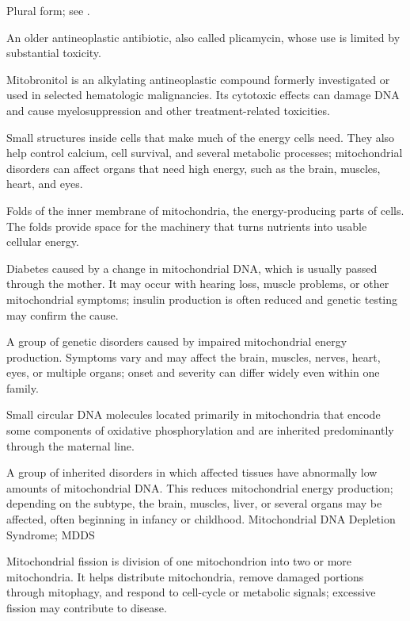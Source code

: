  Plural form; see .

 An older antineoplastic antibiotic, also called plicamycin, whose use is limited by substantial toxicity.

 Mitobronitol is an alkylating antineoplastic compound formerly investigated or used in selected hematologic malignancies. Its cytotoxic effects can damage DNA and cause myelosuppression and other treatment-related toxicities.

 Small structures inside cells that make much of the energy cells need. They also help control calcium, cell survival, and several metabolic processes; mitochondrial disorders can affect organs that need high energy, such as the brain, muscles, heart, and eyes.

 Folds of the inner membrane of mitochondria, the energy-producing parts of cells. The folds provide space for the machinery that turns nutrients into usable cellular energy.

 Diabetes caused by a change in mitochondrial DNA, which is usually passed through the mother. It may occur with hearing loss, muscle problems, or other mitochondrial symptoms; insulin production is often reduced and genetic testing may confirm the cause.

 A group of genetic disorders caused by impaired mitochondrial energy production. Symptoms vary and
may affect the brain, muscles, nerves, heart, eyes, or multiple organs; onset and severity can
differ widely even within one family.

 Small circular DNA molecules located primarily in mitochondria that encode some components of oxidative phosphorylation and are inherited predominantly through the maternal line.

 A group of inherited disorders in which affected tissues have abnormally low amounts of mitochondrial DNA. This reduces mitochondrial energy production; depending on the subtype, the brain, muscles, liver, or several organs may be affected, often beginning in infancy or childhood.
\synonyms
Mitochondrial DNA Depletion Syndrome; MDDS

 Mitochondrial fission is division of one mitochondrion into two or more mitochondria. It helps distribute mitochondria, remove damaged portions through mitophagy, and respond to cell-cycle or metabolic signals; excessive fission may contribute to disease.

